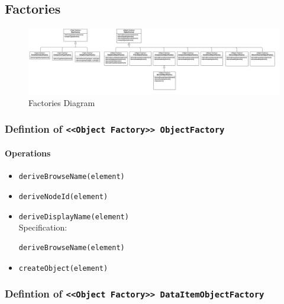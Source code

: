 \FloatBarrier
\subsection{Factories} \label{model:Factories}

\begin{figure}[ht]
  \centering
    \includegraphics[width=1.0\textwidth]{./diagrams/Factories.png}
  \caption{Factories Diagram}
  \label{fig:Factories}
\end{figure}

\FloatBarrier




\subsubsection{Defintion of \texttt{<<Object Factory>> ObjectFactory}} \label{type:ObjectFactory}

\FloatBarrier



\paragraph{Operations}
\begin{itemize}
  \item \texttt{deriveBrowseName(element)}
  \item \texttt{deriveNodeId(element)}
  \item \texttt{deriveDisplayName(element)}\\
    Specification:
   \indent \begin{lstlisting}
deriveBrowseName(element)
\end{lstlisting}

  \item \texttt{createObject(element)}
\end{itemize}
\FloatBarrier
\subsubsection{Defintion of \texttt{<<Object Factory>> DataItemObjectFactory}} \label{type:DataItemObjectFactory}

